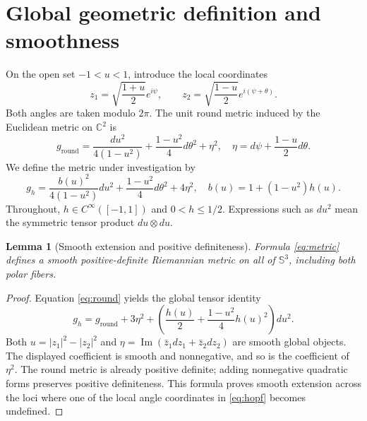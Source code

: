 \documentclass[11pt,a4paper]{article}
\newtheorem{lemma}[theorem]{Lemma}
\theoremstyle{remark}\newtheorem{remark}[theorem]{Remark}
\newcommand{\Sthree}{\mathbb S^3}\newcommand{\R}{\mathbb R}\newcommand{\C}{\mathbb C}\newcommand{\Z}{\mathbb Z}
\begin{document}
\section{Global geometric definition and smoothness}
On the open set $-1<u<1$, introduce the local coordinates
\begin{equation}\label{eq:hopf}
z_1=\sqrt{\frac{1+u}{2}}e^{i\psi},\qquad
z_2=\sqrt{\frac{1-u}{2}}e^{i(\psi+\theta)}.
\end{equation}
Both angles are taken modulo $2\pi$. The unit round metric induced by the Euclidean metric on $\C^2$ is
\begin{equation}\label{eq:round}
g_{\mathrm{round}}=\frac{du^2}{4(1-u^2)}+\frac{1-u^2}{4}d\theta^2+\eta^2,\quad
\eta=d\psi+\frac{1-u}{2}d\theta.
\end{equation}
We define the metric under investigation by
\begin{equation}\label{eq:metric}
\boxed{g_h=\frac{b(u)^2}{4(1-u^2)}du^2+\frac{1-u^2}{4}d\theta^2+4\eta^2,\quad b(u)=1+(1-u^2)h(u).}
\end{equation}
Throughout, $h\in C^\infty([-1,1])$ and $0<h\leq1/2$. Expressions such as $du^2$ mean the symmetric tensor product $du\otimes du$.

\begin{lemma}[Smooth extension and positive definiteness]\label{lem:smooth}
Formula \eqref{eq:metric} defines a smooth positive-definite Riemannian metric on all of $\Sthree$, including both polar fibers.
\end{lemma}
\begin{proof}
Equation \eqref{eq:round} yields the global tensor identity
\[
g_h=g_{\mathrm{round}}+3\eta^2+\left(\frac{h(u)}2+\frac{1-u^2}{4}h(u)^2\right)du^2.
\]
Both $u=|z_1|^2-|z_2|^2$ and $\eta=\operatorname{Im}(\bar z_1dz_1+\bar z_2dz_2)$ are smooth global objects. The displayed coefficient is smooth and nonnegative, and so is the coefficient of $\eta^2$. The round metric is already positive definite; adding nonnegative quadratic forms preserves positive definiteness. This formula proves smooth extension across the loci where one of the local angle coordinates in \eqref{eq:hopf} becomes undefined.
\end{proof}
\end{document}
